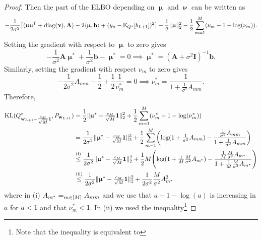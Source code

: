 \documentclass[twoside]{article}
\newcommand{\vb}{\mathbf{b}}
\newcommand{\vw}{\mathbf{w}}
\newcommand{\vmu}{\bm{\upmu}}
\newcommand{\vnu}{\bm{\upnu}}
\newcommand{\vone}{\mathbf{1}}
\newcommand{\mA}{\mathbf{A}}
\newcommand{\mI}{\mathbf{I}}
\newcommand{\E}{\mathbb{E}}
\newcommand{\T}{\text{\textsf{T}}}
\newcommand{\opspace}{}
\let\max\relax\DeclareMathOperator*{\max}{max\opspace}
\newcommand{\diag}{\operatorname{diag}\opspace}
\newcommand{\KL}{\operatorname{KL}}
\DeclarePairedDelimiter\parens{(}{)}             %
\DeclarePairedDelimiter\sbrac{[}{]}              %
\DeclarePairedDelimiter\lra{\langle}{\rangle}    %
\DeclarePairedDelimiter\norm{\|}{\|}             %
\theoremstyle{theoremstyle}
\begin{document}
\begin{proof}
    Then the part of the ELBO depending on $\vmu$ and $\vnu$ can be written as
    \begin{equation}
         -\frac1{2\sigma^2}
        \sbrac*{
            \lra{
                \vmu \vmu^\T + \diag(\vnu),
                \mA
            }
            - 2 \lra{
                    \vmu,
                    \vb
            }
            + (y_n - \E_{Q^*}[b_{L+1}])^2
        }  - \frac12 \norm{\vmu}_2^2 - \frac12 \sum_{m=1}^M(\nu_m - 1 - \log(\nu_m)).
    \end{equation}
    Setting the gradient with respect to $\vmu$ to zero gives
    \begin{equation}
        -\frac1{\sigma^2}\mA \vmu^* + \frac1{\sigma^2}\vb - \vmu^* = 0
        \implies
        \vmu^* = (\mA + \sigma^2 \mI)^{-1}\vb.
    \end{equation}
    Similarly, setting the gradient with respect $\nu_m$ to zero gives
    \begin{equation}
        -\frac{1}{2\sigma^2} A_{mm} - \frac12 + \frac12\frac1{\nu_m^*} = 0
        \implies
        \nu_m^* = \frac{1}{1 + \frac{1}{\sigma^2}A_{mm}}.
    \end{equation}
    Therefore,
    \begin{align}
        \KL(Q^*_{\vw_{L+1} - \tfrac{c_M}{\sqrt{M}} \vone}, P_{\vw_{L+1}})
        &= \frac12 \norm{\vmu^* - \tfrac{c_M}{\sqrt{M}} \vone}_2^2
        + \frac12\sum_{m=1}^M (\nu_m^* - 1 - \log(\nu_m^*)) \\
        &= \frac{1}{2 \sigma^2} \norm{\vmu^* - \tfrac{c_M}{\sqrt{M}} \vone}_2^2
        + \frac{1}{2} \sum_{m=1}^M\parens*{
            \log(1 + \tfrac{1}{\sigma^2}A_{mm})
            - \frac{\tfrac{1}{\sigma^2}A_{mm}}{1 + \tfrac{1}{\sigma^2}A_{mm}}
        } \\
        &\overset{\text{(i)}}{\le} \frac{1}{2 \sigma^2} \norm{\vmu^* - \tfrac{c_M}{\sqrt{M}} \vone}_2^2
        + \frac{1}{2} M\parens*{
            \log(1 + \tfrac1{M}\tfrac{M}{\sigma^2}A_{m^*})
            - \frac{\tfrac1{M}\tfrac{M}{\sigma^2}A_{m^*}}{1 + \tfrac1{M}\tfrac{M}{\sigma^2}A_{m^*}}
        } \\
        &\overset{\text{(ii)}}{\le} \frac{1}{2 \sigma^2} \norm{\vmu^* - \tfrac{c_M}{\sqrt{M}} \vone}_2^2
        + \frac{1}{2 \sigma^2} \frac{M}{\sigma^2}A^2_{m^*}
    \end{align}
    where in (i) $A_{m^*} = \max_{m \in [M]} A_{mm}$ and we use that $a - 1 - \log(a)$ is increasing in $a$ for $a<1$ and that $\nu^*_m<1$. In (ii) we used the inequality\footnote{
        Note that the inequality is equivalent to
}
\end{proof}
\end{document}
